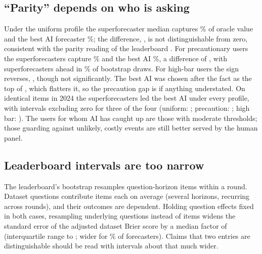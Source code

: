 \documentclass[10pt]{article}
\begin{document}
\subsection{``Parity'' depends on who is asking}
Under the uniform profile the superforecaster median captures \oedSuperUni\% of oracle value and the best AI forecaster \oedBestUni\%; the difference, \linkDiffUni, is not distinguishable from zero, consistent with the parity reading of the leaderboard \cite{fri2026}. For precautionary users the superforecasters capture \oedSuperPre\% and the best AI \oedBestPre\%, a difference of \linkDiffPre, with superforecasters ahead in \linkPPre\% of bootstrap draws. For high-bar users the sign reverses, \linkDiffHigh, though not significantly. The best AI was chosen after the fact as the top of \nCand, which flatters it, so the precaution gap is if anything understated. On identical items in 2024 the superforecasters led the best AI under every profile, with intervals excluding zero for three of the four (uniform: \rOneDiffUni; precaution: \rOneDiffPre; high bar: \rOneDiffHigh). The users for whom AI has caught up are those with moderate thresholds; those guarding against unlikely, costly events are still better served by the human panel.

\subsection{Leaderboard intervals are too narrow}
The leaderboard's bootstrap resamples question-horizon items within a round. Dataset questions contribute \dePer{} items each on average (several horizons, recurring across rounds), and their outcomes are dependent. Holding question effects fixed in both cases, resampling underlying questions instead of items widens the standard error of the adjusted dataset Brier score by a median factor of \deRatio{} (interquartile range \deLo{} to \deHi; wider for \deShare\% of forecasters). Claims that two entries are distinguishable should be read with intervals about that much wider.
\end{document}

